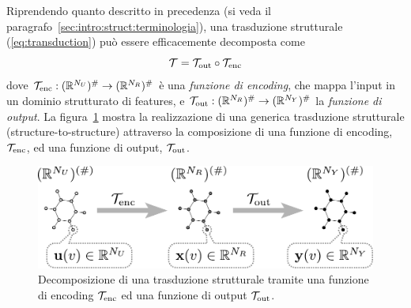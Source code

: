 Riprendendo quanto descritto in precedenza (si veda il paragrafo~\ref{sec:intro:struct:terminologia}), una trasduzione strutturale (\ref{eq:transduction}) può essere efficacemente decomposta come 
\begin{equation}\label{eq:intro:gesn:trasd}
\mathcal{T} = \mathcal{T}_\textup{out} \circ \mathcal{T}_\textup{enc}
\end{equation} 
dove $\mathcal{T}_\textup{enc} : (\mathbb{R}^{N_U})^{\#} \rightarrow (\mathbb{R}^{N_R})^{\#}$ è una \emph{funzione di encoding}, che mappa l'input in un dominio strutturato di features, e $\mathcal{T}_\textup{out} : (\mathbb{R}^{N_R})^{\#} \rightarrow (\mathbb{R}^{N_Y})^{\#}$ la \emph{funzione di output}. 
La figura~\ref{fig:intro:T-enc-out} mostra la realizzazione di una generica trasduzione strutturale (structure-to-structure) attraverso la composizione di una funzione di encoding, $\mathcal{T}_\textup{enc}$, ed una funzione di output, $\mathcal{T}_\textup{out}$.
\begin{figure}[tbp]
\centering
\includegraphics[width=0.8\columnwidth]{img/T-enc-out}
\medskip
\caption[Decomposizione di una trasduzione strutturale.]{Decomposizione di una trasduzione strutturale tramite una funzione di encoding $\mathcal{T}_\textup{enc}$ ed una funzione di output $\mathcal{T}_\textup{out}$.}
\label{fig:intro:T-enc-out}
\end{figure}


